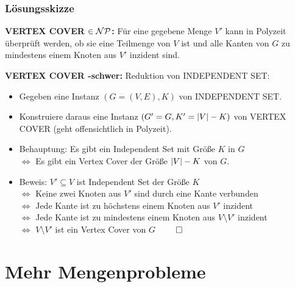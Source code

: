 \begin{frame}
	\frametitle{Lösungsskizze}
	
	\textbf{VERTEX COVER $\in \mathcal{NP}$:} Für eine gegebene Menge $V'$ kann in Polyzeit überprüft werden, ob sie eine Teilmenge von $V$ ist und alle Kanten von $G$ zu mindestens einem Knoten aus $V'$ inzident sind.
	
	\pause \ducttape{.3cm}
	
	\textbf{VERTEX COVER \classNP{}-schwer:} Reduktion von INDEPENDENT SET:
	
	\begin{itemize}
		\item Gegeben eine Instanz $(G = (V,E), K)$ von INDEPENDENT SET.
		\item Konstruiere daraus eine Instanz $(G' = G, K' = \left\vert V \right\vert - K)$ von VERTEX COVER (geht offensichtlich in Polyzeit).
		\pause	\item Behauptung: Es gibt ein Independent Set mit Größe $K$ in $G$ \\ $\Leftrightarrow$ Es gibt ein Vertex Cover der Größe $\left\vert V \right\vert - K$ von $G$.
		\pause \item Beweis: $V' \subseteq V$ ist Independent Set der Größe $K$ \\ $\Leftrightarrow$ Keine zwei Knoten aus $V'$ sind durch eine Kante verbunden \\ $\Leftrightarrow$ Jede Kante ist zu höchstens einem Knoten aus $V'$ inzident \\ $\Leftrightarrow$ Jede Kante ist zu mindestens einem Knoten aus $V \setminus V'$ inzident \\ $\Leftrightarrow$ $V \setminus V'$ ist ein Vertex Cover von $G$ $\qedhere$
	\end{itemize}
\end{frame}

\section{Mehr Mengenprobleme}
\subsection{}


